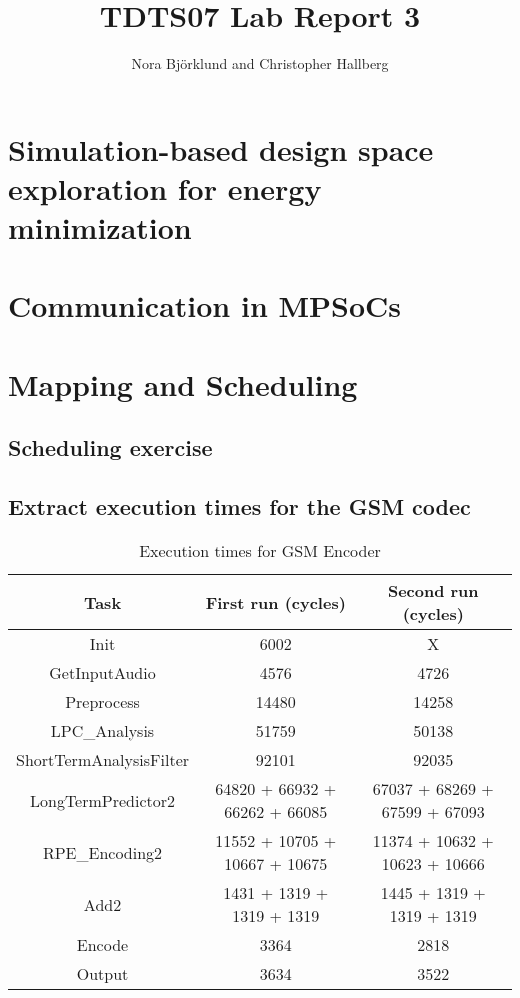 \documentclass[a4paper, 12pt]{article}
\title{TDTS07 Lab Report 3}
\author{Nora Björklund and Christopher Hallberg}
\begin{document}
\maketitle


\section{Simulation-based design space exploration for energy minimization}
\section{Communication in MPSoCs}
\section{Mapping and Scheduling}
\subsection{Scheduling exercise}
\subsection{Extract execution times for the GSM codec}

\begin{table}[h]
  \centering
  \begin{tabular}{c c c}
    \hline
    Task & First run (cycles) & Second run (cycles) \\
    \hline
    Init & 6002  & X \\
    GetInputAudio & 4576  & 4726 \\
    Preprocess & 14480  & 14258  \\
    LPC\_Analysis & 51759  & 50138 \\
    ShortTermAnalysisFilter & 92101 & 92035 \\
    LongTermPredictor2 & 64820 + 66932 + 66262 + 66085 & 67037 + 68269 + 67599 + 67093 \\
    RPE\_Encoding2 & 11552 + 10705 + 10667 + 10675 & 11374 + 10632 + 10623 + 10666\\
    Add2 & 1431 + 1319 + 1319 + 1319 & 1445 + 1319 + 1319 + 1319\\
    Encode & 3364 & 2818 \\
    Output & 3634 & 3522 \\
  \end{tabular}
  \caption{Execution times for GSM Encoder}
\end{table}
\end{document}
